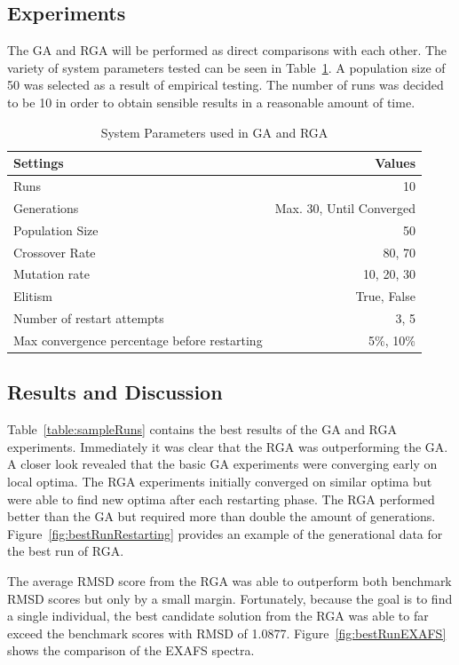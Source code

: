 \documentclass[conference]{IEEEtran}
\begin{document}
\subsection{Experiments}

The GA and RGA will be performed as direct comparisons with each other. The variety of system parameters tested can be seen in Table~\ref{table:gaParameters}. A population size of 50 was selected as a result of empirical testing. The number of runs was decided to be 10 in order to obtain sensible results in a reasonable amount of time.

\begin{table}
\caption{System Parameters used in GA and RGA}
\label{table:gaParameters}
\centering
\begin{tabular}{ | l | r | }
  \hline
    Settings & Values \\ \hline \hline
    Runs & 10 \\ \hline
    Generations & Max. 30, Until Converged \\ \hline
    Population Size & 50 \\ \hline
    Crossover Rate & 80, 70 \\ \hline
    Mutation rate & 10, 20, 30 \\ \hline
    Elitism & True, False \\ \hline
    Number of restart attempts & 3, 5 \\ \hline
    Max convergence percentage before restarting & 5\%, 10\% \\ \hline
\end{tabular}
\end{table}

\subsection{Results and Discussion}

Table~\ref{table:sampleRuns} contains the best results of the GA and RGA experiments. Immediately it was clear that the RGA was outperforming the GA. A closer look revealed that the basic GA experiments were converging early on local optima. The RGA experiments initially converged on similar optima but were able to find new optima after each restarting phase. The RGA performed better than the GA but required more than double the amount of generations. Figure~\ref{fig:bestRunRestarting} provides an example of the generational data for the best run of RGA.

The average RMSD score from the RGA was able to outperform both benchmark RMSD scores but only by a small margin. Fortunately, because the goal is to find a single individual, the best candidate solution from the RGA was able to far exceed the benchmark scores with RMSD of 1.0877. Figure~\ref{fig:bestRunEXAFS} shows the comparison of the EXAFS spectra.
\end{document}

